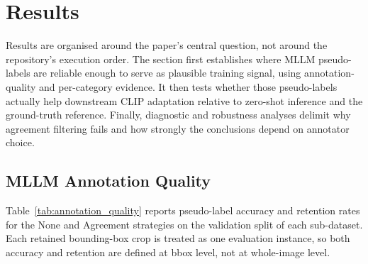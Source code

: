 \documentclass{ieeeaccess}
\begin{document}
\section{Results}
\label{sec:results}

Results are organised around the paper's central question, not around
the repository's execution order.
The section first establishes where MLLM pseudo-labels are reliable
enough to serve as plausible training signal, using annotation-quality
and per-category evidence.
It then tests whether those pseudo-labels actually help downstream
CLIP adaptation relative to zero-shot inference and the ground-truth
reference.
Finally, diagnostic and robustness analyses delimit why agreement
filtering fails and how strongly the conclusions depend on annotator
choice.

\subsection{MLLM Annotation Quality}
\label{sec:annot_quality}

Table~\ref{tab:annotation_quality} reports pseudo-label accuracy and
retention rates for the None and Agreement strategies on the
validation split of each sub-dataset.
Each retained bounding-box crop is treated as one evaluation instance,
so both accuracy and retention are defined at bbox level, not at
whole-image level.

\begin{table}[!t]
\caption{MLLM pseudo-label annotation accuracy and retention rate
on the validation split. ``Pseudo-label acc.'' = percentage of pseudo-labels
matching the ground-truth label for retained bbox crops. Under the None strategy,
``Retained'' is the number of crops with a valid Qwen index; Qwen
produces valid outputs for more than 99.9\% of validation crops.
These retention rates are computed on the validation split only;
training-set retention rates used later in the retention-ratio analysis
are reported separately in the text and figure.}
\label{tab:annotation_quality}
\centering
{}
\end{table}
\end{document}

